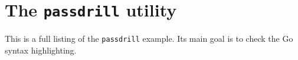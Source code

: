 \chapter{The {\tt passdrill} utility}
\label{passdrill}


This is a full listing of the {\tt passdrill} example. Its main goal is to check the Go syntax highlighting.


